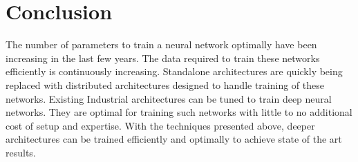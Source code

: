 \documentclass[sigconf]{acmart}
\begin{document}
\section{Conclusion}

The number of parameters to train a neural network optimally have been increasing in the last few years. The data required to train these networks efficiently is continuously increasing. Standalone architectures are quickly being replaced with distributed architectures designed to handle training of these networks. Existing Industrial architectures can be tuned to train deep neural networks. They are optimal for training such networks with little to no additional cost of setup and expertise. With the techniques presented above, deeper architectures can be trained efficiently and optimally to achieve state of the art results.


 
\end{document}
